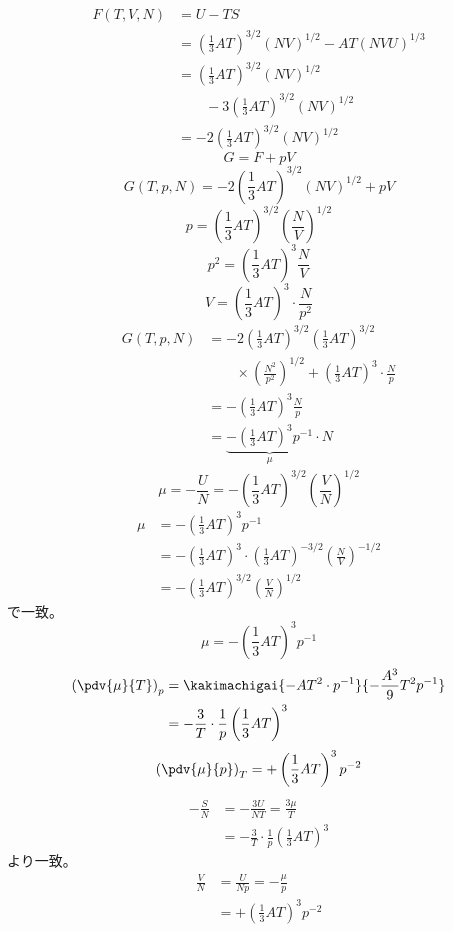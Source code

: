 \begin{align*}
F(T,V,N)&=U-TS\\
&=\left(\frac{1}{3}AT\right)^{3/2}(NV)^{1/2}-AT(NVU)^{1/3}\\
&=\left(\frac{1}{3}AT\right)^{3/2}(NV)^{1/2}\\
&\qquad-3\left(\frac{1}{3}AT\right)^{3/2}(NV)^{1/2}\\
&=-2\left(\frac{1}{3}AT\right)^{3/2}(NV)^{1/2}
\end{align*}
\[ G=F+pV \]
\[ G(T,p,N)=-2\left(\frac{1}{3}AT\right)^{3/2}(NV)^{1/2}+pV \]
\[ p=\left(\frac{1}{3}AT\right)^{3/2}\left(\frac{N}{V}\right)^{1/2} \]
\[ p^{2}=\left(\frac{1}{3}AT\right)^{3}\frac{N}{V} \]
\[ V=\left(\frac{1}{3}AT\right)^{3}\cdot\frac{N}{p^{2}} \]
\begin{align*}
G(T,p,N)&=-2\left(\frac{1}{3}AT\right)^{3/2}\left(\frac{1}{3}AT\right)^{3/2}\\
&\qquad\times\left(\frac{N^{2}}{p^{2}}\right)^{1/2}+\left(\frac{1}{3}AT\right)^{3}\cdot\frac{N}{p}\\
&=-\left(\frac{1}{3}AT\right)^{3}\frac{N}{p}\\
&=\underbrace{-\left(\frac{1}{3}AT\right)^{3}p^{-1}}_{\mu}\cdot N
\end{align*}
\[ \mu=-\frac{U}{N}=-\left(\frac{1}{3}AT\right)^{3/2}\left(\frac{V}{N}\right)^{1/2} \]
\begin{align*}
\mu&=-\left(\frac{1}{3}AT\right)^{3}p^{-1}\\
&=-\left(\frac{1}{3}AT\right)^{3}\cdot\left(\frac{1}{3}AT\right)^{-3/2}\left(\frac{N}{V}\right)^{-1/2}\\
&=-\left(\frac{1}{3}AT\right)^{3/2}\left(\frac{V}{N}\right)^{1/2}
\end{align*}
で一致。
\[ \mu=-\left(\frac{1}{3}AT\right)^{3}p^{-1} \]
\begin{align*}
\left(\pdv{\mu}{T}\right)_{p}&=\kakimachigai{-AT^{2}\cdot p^{-1}}{-\frac{A^{3}}{9}T^{2}p^{-1}}\\
&=-\frac{3}{T}\cdot\frac{1}{p}\left(\frac{1}{3}AT\right)^{3}
\end{align*}
\[ \left(\pdv{\mu}{p}\right)_{T}=+\left(\frac{1}{3}AT\right)^{3}p^{-2} \]
\begin{align*}
-\frac{S}{N}&=-\frac{3U}{NT}=\frac{3\mu}{T}\\
&=-\frac{3}{T}\cdot\frac{1}{p}\left(\frac{1}{3}AT\right)^{3}
\end{align*}
より一致。
\begin{align*}
\frac{V}{N}&=\frac{U}{Np}=-\frac{\mu}{p}\\
&=+\left(\frac{1}{3}AT\right)^{3}p^{-2}
\end{align*}
